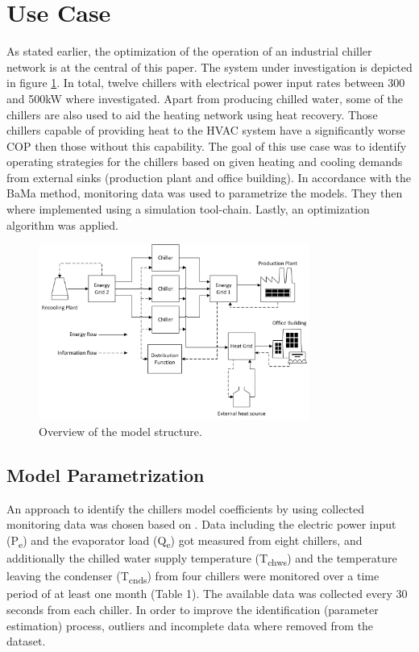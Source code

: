 \documentclass[3p,times,procedia,twocolumn,twoside]{elsarticle}
\begin{document}
\section{Use Case}
As stated earlier, the optimization of the operation of an industrial chiller network is at the central of this paper. The system under investigation is depicted in figure \ref{FIG_Model}. In total, twelve chillers with electrical power input rates between 300 and 500kW where investigated. Apart from producing chilled water, some of the chillers are also used to aid the heating network using heat recovery. Those chillers capable of providing heat to the HVAC system have a significantly worse COP then those without this capability. The goal of this use case was to identify operating strategies for the chillers based on given heating and cooling demands from external sinks (production plant and office building). In accordance with the BaMa method, monitoring data was used to parametrize the models. They then where implemented using a simulation tool-chain. Lastly, an optimization algorithm was applied. 
\begin{figure}[t]
	\vspace*{10pt}
	\centerline{\includegraphics[width=21pc]{figures/modelstructure}}
	\caption{Overview of the model structure.}
	\label{FIG_Model}
\end{figure}
\subsection{Model Parametrization}
An approach to identify the chillers model coefficients by using collected monitoring data was chosen based on \cite{Monfet}. Data including the electric power input (P\textsubscript{e}) and the evaporator load (Q\textsubscript{e}) got measured from eight chillers, and additionally the chilled water supply temperature (T\textsubscript{chws}) and the temperature leaving the condenser (T\textsubscript{cnds}) from four chillers were monitored over a time period of at least one month (Table 1). The available data was collected every 30 seconds from each chiller. In order to improve the identification (parameter estimation) process, outliers and incomplete data where removed from the dataset. 
\end{document}
